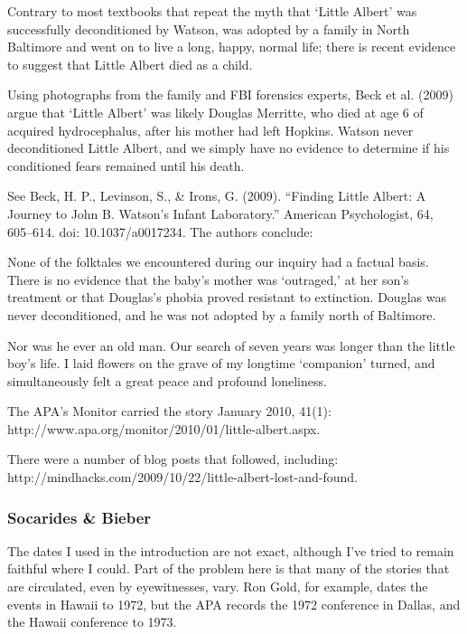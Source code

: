 \begin{refsection}
Contrary to most textbooks that repeat the myth that `Little Albert' was successfully deconditioned by Watson, was adopted by a family in North Baltimore and went on to live a long, happy, normal life; there is recent evidence to suggest that Little Albert died as a child. 

Using photographs from the family and FBI forensics experts, Beck et al. (2009) argue that `Little Albert' was likely Douglas Merritte, who died at age 6 of acquired hydrocephalus, after his mother had left Hopkins. Watson never deconditioned Little Albert, and we simply have no evidence to determine if his conditioned fears remained until his death. 

See Beck, H. P., Levinson, S., \& Irons, G. (2009). ``Finding Little Albert: A Journey to John B. Watson's Infant Laboratory.'' American Psychologist, 64, 605--614. doi: 10.1037\slash a0017234. The authors conclude:

None of the folktales we encountered during our inquiry had a factual basis. There is no evidence that the baby's mother was `outraged‚' at her son's treatment or that Douglas's phobia proved resistant to extinction. Douglas was never deconditioned, and he was not adopted by a family north of Baltimore.

Nor was he ever an old man. Our search of seven years was longer than the little boy's life. I laid flowers on the grave of my longtime `companion' turned, and simultaneously felt a great peace and profound loneliness.

The APA's Monitor carried the story January 2010, 41(1): http:\slash \slash www.apa.org\slash monitor\slash 2010\slash 01\slash little-albert.aspx.

There were a number of blog posts that followed, including: http:\slash \slash mindhacks.com\slash 2009\slash 10\slash 22\slash little-albert-lost-and-found. 

\subsubsection{Socarides \& Bieber}
\label{socaridesbieber}

The dates I used in the introduction are not exact, although I've tried to remain faithful where I could. Part of the problem here is that many of the stories that are circulated, even by eyewitnesses, vary. Ron Gold, for example, dates the events in Hawaii to 1972, but the APA records the 1972 conference in Dallas, and the Hawaii conference to 1973. 


\end{refsection}
